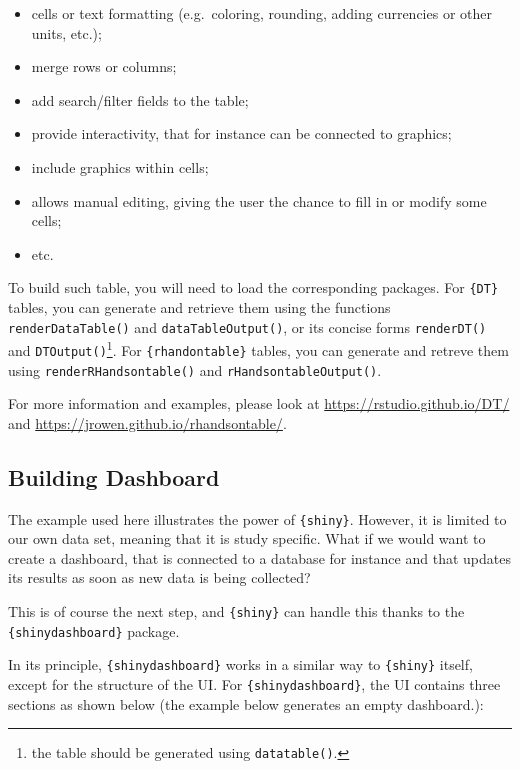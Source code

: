 \documentclass[
]{book}
\providecommand{\tightlist}{%
  \setlength{\itemsep}{0pt}\setlength{\parskip}{0pt}}
\begin{document}
\begin{itemize}
\tightlist
\item
  cells or text formatting (e.g.~coloring, rounding, adding currencies or other units, etc.);
\item
  merge rows or columns;
\item
  add search/filter fields to the table;
\item
  provide interactivity, that for instance can be connected to graphics;
\item
  include graphics within cells;
\item
  allows manual editing, giving the user the chance to fill in or modify some cells;
\item
  etc.
\end{itemize}

To build such table, you will need to load the corresponding packages. For \texttt{\{DT\}} tables, you can generate and retrieve them using the functions \texttt{renderDataTable()} and \texttt{dataTableOutput()}, or its concise forms \texttt{renderDT()} and \texttt{DTOutput()}\footnote{the table should be generated using \texttt{datatable()}.}. For \texttt{\{rhandontable\}} tables, you can generate and retreve them using \texttt{renderRHandsontable()} and \texttt{rHandsontableOutput()}.

For more information and examples, please look at \url{https://rstudio.github.io/DT/} and \url{https://jrowen.github.io/rhandsontable/}.

\hypertarget{building-dashboard}{%
\subsection{Building Dashboard}\label{building-dashboard}}

The example used here illustrates the power of \texttt{\{shiny\}}. However, it is limited to our own data set, meaning that it is study specific. What if we would want to create a dashboard, that is connected to a database for instance and that updates its results as soon as new data is being collected?

This is of course the next step, and \texttt{\{shiny\}} can handle this thanks to the \texttt{\{shinydashboard\}} package.

In its principle, \texttt{\{shinydashboard\}} works in a similar way to \texttt{\{shiny\}} itself, except for the structure of the UI. For \texttt{\{shinydashboard\}}, the UI contains three sections as shown below (the example below generates an empty dashboard.):
\end{document}
